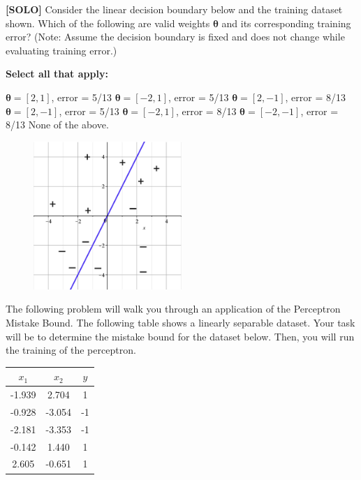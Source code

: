 \documentclass[11pt,addpoints,answers]{exam}
\begin{document}
\begin{questions}
    
    \question[2] \textbf{[SOLO]} Consider the linear decision boundary below and the training dataset shown. Which of the following are valid weights $\bm{\theta}$ and its corresponding training error? (Note: Assume the decision boundary is fixed and does not change while evaluating training error.)
    
    \textbf{Select all that apply:}
    {%
    \checkboxchar{$\Box$} \checkedchar{$\blacksquare$}
    \begin{checkboxes}
        \choice $\bm{\theta} = [2,1]$, error  = 5/13
        \CorrectChoice $\bm{\theta} = [-2,1]$, error = 5/13
        \CorrectChoice $\bm{\theta} = [2,-1]$, error = 8/13
        \choice $\bm{\theta} = [2,-1]$, error = 5/13
        \choice $\bm{\theta} = [-2,1]$, error = 8/13
        \choice $\bm{\theta} = [-2,-1]$, error = 8/13
        \choice None of the above.
    \end{checkboxes}
    }
    
    
    \begin{figure}[H]
        \centering
        \includegraphics[width = 0.5\textwidth]{images/perceptron_boundary.png}
        \label{Q_10perceptron}
    \end{figure}
    
    
    \clearpage
    
    
    \question[9] The following problem will walk you through an application of the Perceptron Mistake Bound. The following table shows a linearly separable dataset. Your task will be to determine the mistake bound for the dataset below. Then, you will run the training of the perceptron.
    
    \begin{center}
    \begin{tabular}{||c c c||}
        \hline
         $x_1$ & $x_2$ & $y$ \\ [0.5ex]
        \hline\hline
        -1.939 & 2.704 & 1 \\
        \hline
        -0.928 & -3.054 & -1 \\
        \hline
        -2.181 & -3.353 & -1 \\
        \hline
        -0.142 & 1.440 & 1 \\
        \hline
        2.605 & -0.651 & 1 \\
        \hline
    \end{tabular}
    \end{center}
    

\end{questions}
\end{document}
